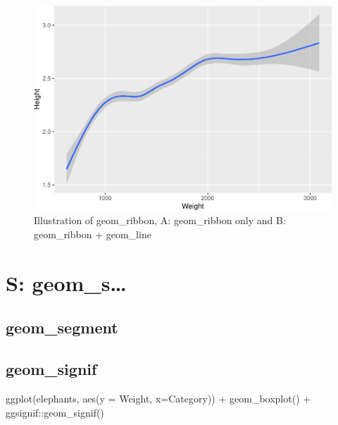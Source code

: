 \documentclass[
]{book}
\newenvironment{Shaded}{\begin{snugshade}}{\end{snugshade}}
\newcommand{\AttributeTok}[1]{\textcolor[rgb]{0.77,0.63,0.00}{#1}}
\newcommand{\FunctionTok}[1]{\textcolor[rgb]{0.00,0.00,0.00}{#1}}
\newcommand{\NormalTok}[1]{#1}
\newcommand{\SpecialCharTok}[1]{\textcolor[rgb]{0.00,0.00,0.00}{#1}}
\begin{document}
\begin{figure}
\centering
\includegraphics{Data-Visualisation-geom-Encyclopedia_files/figure-latex/unnamed-chunk-47-1.pdf}
\caption{\label{fig:unnamed-chunk-47}Illustration of geom\_ribbon, A: geom\_ribbon only and B: geom\_ribbon + geom\_line}
\end{figure}

\hypertarget{s-geom_s}{%
\chapter{S: geom\_s\ldots{}}\label{s-geom_s}}

\hypertarget{geom_segment}{%
\section{geom\_segment}\label{geom_segment}}

\hypertarget{geom_signif}{%
\section{geom\_signif}\label{geom_signif}}

\begin{Shaded}
\begin{Highlighting}[]
\FunctionTok{ggplot}\NormalTok{(elephants, }\FunctionTok{aes}\NormalTok{(}\AttributeTok{y =}\NormalTok{ Weight, }\AttributeTok{x=}\NormalTok{Category)) }\SpecialCharTok{+} \FunctionTok{geom\_boxplot}\NormalTok{() }\SpecialCharTok{+}\NormalTok{ ggsignif}\SpecialCharTok{::}\FunctionTok{geom\_signif}\NormalTok{()}
\end{Highlighting}
\end{Shaded}
\end{document}
